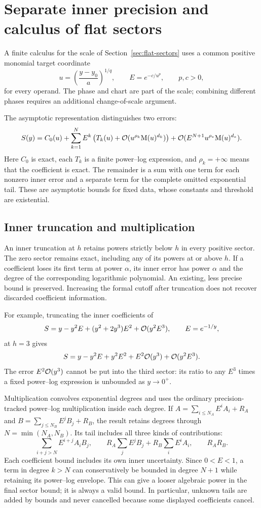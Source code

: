 \section{Separate inner precision and calculus of flat sectors}
\label{sec:flat-sector-operations}

A finite calculus for the scale of Section~\ref{sec:flat-sectors}
uses a common positive monomial target coordinate
\[
 u=\left(\frac{y-y_0}{a}\right)^{1/q},\qquad
 E=e^{-c/u^p},\qquad p,c>0,
\]
for every operand. The phase and chart are part of the scale; combining
different phases requires an additional change-of-scale argument.

The asymptotic representation distinguishes two errors:
\begin{equation}
 S(y)=C_0(u)+\sum_{k=1}^{N}E^k
 \left(T_k(u)+\mathcal O(u^{\rho_k}\mathrm M(u)^{d_k})\right)
 +\mathcal O(E^{N+1}u^{\rho_*}\mathrm M(u)^{d_*}).
 \label{eq:flat-two-precision}
\end{equation}
Here $C_0$ is exact, each $T_k$ is a finite power--log expression, and
$\rho_k=+\infty$ means that the coefficient is exact. The remainder
is a sum with one term for each nonzero inner error and a separate term
for the complete omitted exponential tail. These are asymptotic bounds for
fixed data, whose constants and threshold are existential.

\subsection{Inner truncation and multiplication}

An inner truncation at $h$ retains powers strictly below $h$ in every
positive sector. The zero sector remains exact, including any of its powers
at or above $h$. If a coefficient loses its first term at power $\alpha$,
its inner error has power $\alpha$ and the degree of the corresponding
logarithmic polynomial. An existing, less precise bound is preserved.
Increasing the formal cutoff after truncation does not recover discarded
coefficient information.

For example, truncating the inner coefficients of
\[
 S=y-y^2E+(y^2+2y^3)E^2+\mathcal O(y^2E^3),\qquad E=e^{-1/y},
\]
at $h=3$ gives
\[
 S=y-y^2E+y^2E^2+E^2\mathcal O(y^3)+\mathcal O(y^2E^3).
\]
The error $E^2\mathcal O(y^3)$ cannot be put into the third sector: its ratio to
any $E^3$ times a fixed power--log expression is unbounded as $y\to0^+$.

Multiplication convolves exponential degrees and uses the ordinary
precision-tracked power--log multiplication inside each degree. If
$A=\sum_{i\le N_A}E^i A_i+R_A$ and
$B=\sum_{j\le N_B}E^j B_j+R_B$, the result retains degrees through
$N=\min(N_A,N_B)$. Its tail includes all three kinds of contributions:
\[
 \sum_{i+j>N}E^{i+j}A_iB_j,
 \qquad R_A\sum_j E^j B_j+R_B\sum_i E^i A_i,
 \qquad R_A R_B.
\]
Each coefficient bound includes its own inner uncertainty. Since $0<E<1$,
a term in degree $k>N$ can conservatively be bounded in degree $N+1$
while retaining its power--log envelope. This can give a looser algebraic
power in the final sector bound; it is always a valid bound. In particular,
unknown tails are added by bounds and never cancelled because some displayed
coefficients cancel.

